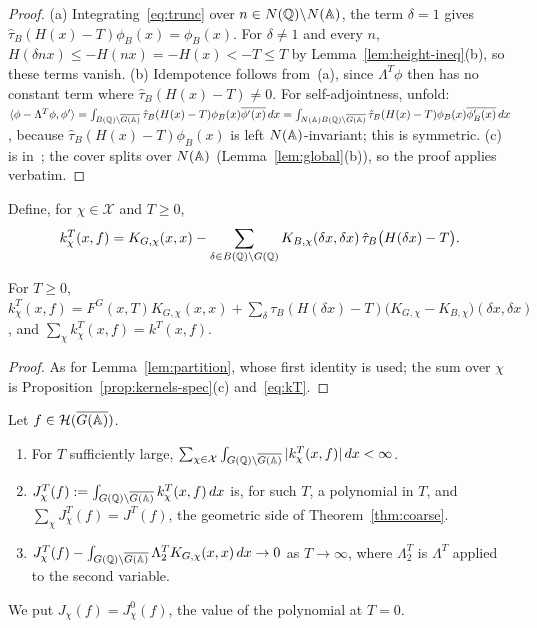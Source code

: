 \begin{proof}
(a) Integrating~\eqref{eq:trunc} over $n\in N(\mathbb{Q})\backslash N(\mathbb{A})$, the
term $\delta=1$ gives $\hat\tau_B(H(x)-T)\phi_B(x)=\phi_B(x)$. For
$\delta\ne1$ and every $n$, $H(\delta nx)\le-H(nx)=-H(x)<-T\le T$ by
Lemma~\ref{lem:height-ineq}(b), so these terms vanish. (b) Idempotence
follows from~(a), since $\Lambda^T\phi$ then has no constant term where
$\hat\tau_B(H(x)-T)\ne0$. For self-adjointness, unfold:
$\langle\phi-\Lambda^T\phi,\phi'\rangle=\int_{B(\mathbb{Q})\backslash\overline{G(\mathbb{A})}}
\hat\tau_B(H(x)-T)\phi_B(x)\overline{\phi'(x)}\,dx=\int_{N(\mathbb{A})B(\mathbb{Q})
\backslash\overline{G(\mathbb{A})}}\hat\tau_B(H(x)-T)\phi_B(x)\overline{\phi'_B(x)}\,dx$, because
$\hat\tau_B(H(x)-T)\phi_B(x)$ is left $N(\mathbb{A})$-invariant; this is symmetric.
(c) is in~\cite[\S1]{Ar80}; the cover splits over $N(\mathbb{A})$
(Lemma~\ref{lem:global}(b)), so the proof applies verbatim.
\end{proof}

Define, for $\chi\in\mathcal X$ and $T\ge0$,
\begin{equation}\label{eq:kchi}
k^T_\chi(x,f)=K_{G,\chi}(x,x)-\sum_{\delta\in B(\mathbb{Q})\backslash G(\mathbb{Q})}
K_{B,\chi}(\delta x,\delta x)\,\hat\tau_B\bigl(H(\delta x)-T\bigr).
\end{equation}

\begin{lemma}\label{lem:kchi}
For $T\ge0$, $k^T_\chi(x,f)=F^G(x,T)K_{G,\chi}(x,x)+\sum_{\delta}
\tau_B(H(\delta x)-T)\bigl(K_{G,\chi}-K_{B,\chi}\bigr)(\delta x,\delta x)$,
and $\sum_\chi k^T_\chi(x,f)=k^T(x,f)$.
\end{lemma}

\begin{proof}
As for Lemma~\ref{lem:partition}, whose first identity is used; the sum
over $\chi$ is Proposition~\ref{prop:kernels-spec}(c) and~\eqref{eq:kT}.
\end{proof}

\begin{theorem}\label{thm:Jchi-poly}
Let $f\in\mathcal H(\overline{G(\mathbb{A})})$.
\begin{enumerate}[label=(\alph*)]
\item For $T$ sufficiently large, $\sum_{\chi\in\mathcal X}\int_{G(\mathbb{Q})
  \backslash\overline{G(\mathbb{A})}}|k^T_\chi(x,f)|\,dx<\infty$.
\item $J^T_\chi(f):=\int_{G(\mathbb{Q})\backslash\overline{G(\mathbb{A})}}k^T_\chi(x,f)\,dx$ is, for
  such $T$, a polynomial in $T$, and $\sum_\chi J^T_\chi(f)=J^T(f)$, the
  geometric side of Theorem~\ref{thm:coarse}.
\item $J^T_\chi(f)-\int_{G(\mathbb{Q})\backslash\overline{G(\mathbb{A})}}\Lambda^T_2K_{G,\chi}(x,x)\,dx
  \to0$ as $T\to\infty$, where $\Lambda^T_2$ is $\Lambda^T$ applied to the
  second variable.
\end{enumerate}
We put $J_\chi(f)=J^0_\chi(f)$, the value of the polynomial at $T=0$.
\end{theorem}

